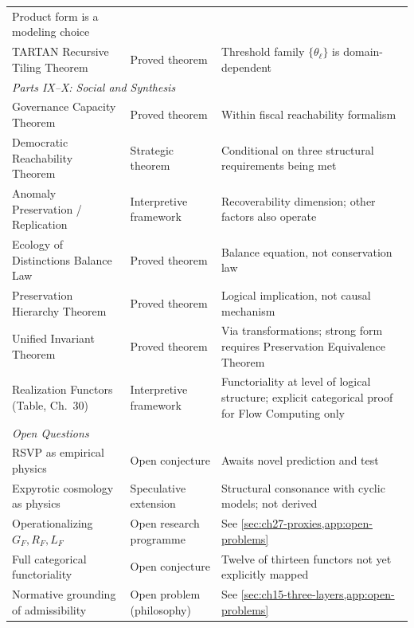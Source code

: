 \documentclass[12pt,twoside,openright]{book}
\begin{document}
\begin{center}
\begin{tabular}{p{5.5cm}lp{5cm}}
  Product form is a modeling choice \\
TARTAN Recursive Tiling Theorem & Proved theorem &
  Threshold family $\{\theta_\ell\}$ is domain-dependent \\
\midrule
\multicolumn{3}{l}{\itshape Parts IX--X: Social and Synthesis} \\[2pt]
Governance Capacity Theorem & Proved theorem &
  Within fiscal reachability formalism \\
Democratic Reachability Theorem & Strategic theorem &
  Conditional on three structural requirements being met \\
Anomaly Preservation / Replication & Interpretive framework &
  Recoverability dimension; other factors also operate \\
Ecology of Distinctions Balance Law & Proved theorem &
  Balance equation, not conservation law \\
Preservation Hierarchy Theorem & Proved theorem &
  Logical implication, not causal mechanism \\
Unified Invariant Theorem & Proved theorem &
  Via transformations; strong form requires
  Preservation Equivalence Theorem \\
Realization Functors (Table, Ch.\ 30) & Interpretive framework &
  Functoriality at level of logical structure;
  explicit categorical proof for Flow Computing only \\
\midrule
\multicolumn{3}{l}{\itshape Open Questions} \\[2pt]
RSVP as empirical physics & Open conjecture &
  Awaits novel prediction and test \\
Expyrotic cosmology as physics & Speculative extension &
  Structural consonance with cyclic models; not derived \\
Operationalizing $G_F, R_F, L_F$ & Open research programme &
  See \cref{sec:ch27-proxies,app:open-problems} \\
Full categorical functoriality & Open conjecture &
  Twelve of thirteen functors not yet explicitly mapped \\
Normative grounding of admissibility & Open problem (philosophy) &
  See \cref{sec:ch15-three-layers,app:open-problems} \\
\bottomrule
\end{tabular}
\end{center}
\end{document}
